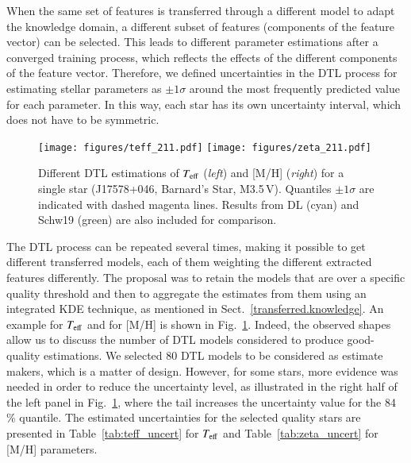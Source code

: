 \documentclass{aa}
\begin{document}
When the same set of features is transferred through a different model to adapt the knowledge domain, a different subset of features (components of the feature vector) can be selected. 
This leads to different parameter estimations after a converged training process, which reflects the effects of the different components of the feature vector. Therefore, we defined uncertainties in the DTL process for estimating stellar parameters as $\pm 1 \sigma$ around the most frequently predicted value for each parameter. In this way, each star has its own uncertainty interval, {which does not have to be symmetric.}

\begin{figure*}
\centering
        \texttt{[image: figures/teff\_211.pdf]}  
        \texttt{[image: figures/zeta\_211.pdf]}  
        \caption{Different DTL estimations of $T_{\rm eff}$  ({\it left}) and [M/H] ({\it right}) for a single star (J17578+046, Barnard’s Star, M3.5\,V).
        Quantiles $\pm 1 \sigma$ are indicated with dashed magenta lines. 
        Results from DL (cyan) and Schw19 (green) are also included for comparison.}
        \label{fig:dtl_teff_zeta_kde}
\end{figure*}

The DTL process can be repeated several times, making it possible to get different transferred models, each of them weighting the different extracted features differently. 
The proposal was to retain the models that are over a specific quality threshold and then to aggregate the {estimates} from them using an integrated KDE technique, as mentioned in Sect.~\ref{transferred.knowledge}. 
An example for $T_{\rm eff}$ and for [M/H] is shown in Fig.~\ref{fig:dtl_teff_zeta_kde}.
Indeed, the observed shapes allow us to discuss the number of DTL models considered to {produce} good-quality estimations. 
We selected 80 DTL models to be considered as {estimate} makers, which is a matter of design. However, for some stars, more evidence was needed in order to reduce the uncertainty level, as illustrated in the right half of the left panel in Fig.~\ref{fig:dtl_teff_zeta_kde}, where the tail increases the uncertainty value for {the 84\,\% quantile}. 
The estimated uncertainties for the selected quality stars are presented in Table~\ref{tab:teff_uncert} for $T_{\rm eff}$ and Table~\ref{tab:zeta_uncert} for [M/H] parameters.
\end{document}
